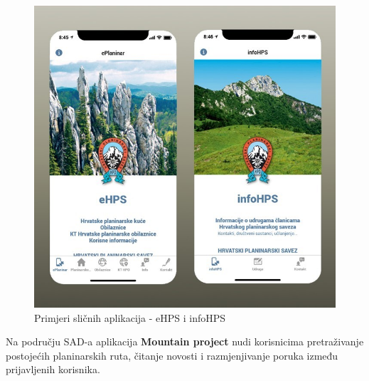 			\begin{figure}[H]
			\includegraphics[scale=0.5]{slike/HPS.jpg} %
			\centering
			\caption{Primjeri sličnih aplikacija - eHPS i infoHPS}
			\label{fig:slične aplikacije}
			\end{figure}
	
		Na području SAD-a aplikacija \textbf{Mountain project} nudi korisnicima pretraživanje postojećih planinarskih ruta, čitanje novosti i razmjenjivanje poruka između prijavljenih korisnika.
			
